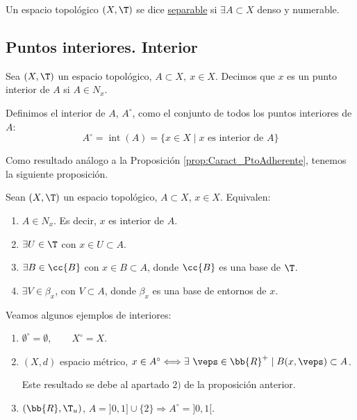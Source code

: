 \begin{definicion}
    Un espacio topológico $(X,\T)$ se dice \ul{separable} si $\exists A\subset X$ denso y numerable.
\end{definicion}


\subsection{Puntos interiores. Interior}
\begin{definicion}
    Sea $(X,\T)$ un espacio topológico, $A\subset X,~x\in X$. Decimos que $x$ es un punto interior de $A$ si $A\in N_x$.
    
    Definimos el interior de $A$, $A^\circ$, como el conjunto de todos los puntos interiores de $A$:
    \begin{equation*}
        A^\circ = \operatorname{int}(A)=\{x\in X\mid x \text{ es interior de } A\}
    \end{equation*}    
\end{definicion}

Como resultado análogo a la Proposición \ref{prop:Caract_PtoAdherente}, tenemos la siguiente proposición.
\begin{prop}\label{prop:Caract_PtoInterior}
    Sean $(X,\T)$ un espacio topológico, $A\subset X$, $x\in X$. Equivalen:
    \begin{enumerate}
        \item $A\in N_x$. Es decir, $x$ es interior de $A$.
        \item $\exists U\in \T$ con $x\in U\subset A$.
        \item $\exists B\in \cc{B}$ con $x\in B\subset A$, donde $\cc{B}$ es una base de $\T$.
        \item $\exists V\in \beta_x$, con $V\subset A$, donde $\beta_x$ es una base de entornos de $x$.
    \end{enumerate}
\end{prop}


    
    
\begin{ejemplo} Veamos algunos ejemplos de interiores:
    \begin{enumerate}
        \item $\emptyset^\circ = \emptyset,\qquad X^\circ = X$.
        \item $(X,d)$ espacio métrico, $x\in A^\circ \Longleftrightarrow \exists~\veps\in \bb{R}^+\mid B(x,\veps)\subset A$.

        Este resultado se debe al apartado $2)$ de la proposición anterior.
        \item $(\bb{R},\T_u)$, $A=]0,1]\cup \{2\}\Longrightarrow A^\circ = ]0,1[$.
    \end{enumerate}
\end{ejemplo}\vspace{1em}

